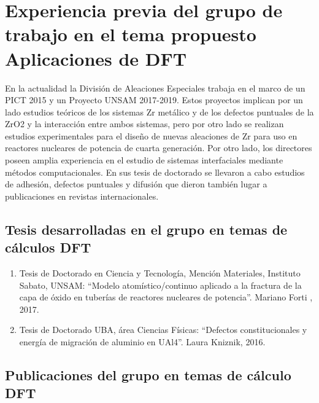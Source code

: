 \section*{Experiencia previa del grupo de trabajo en el tema propuesto Aplicaciones 
de DFT}

En la actualidad la División de Aleaciones Especiales trabaja en el marco de un 
PICT 2015 y un Proyecto UNSAM 2017-2019. Estos proyectos implican por un lado 
estudios teóricos de los sistemas Zr metálico y de los defectos puntuales de la 
ZrO2 y la interacción entre ambos sistemas, pero por otro lado se realizan 
estudios experimentales para el diseño de nuevas aleaciones de Zr para uso en 
reactores nucleares de potencia de cuarta generación. 
Por otro lado, los directores poseen amplia experiencia en el estudio de 
sistemas interfaciales mediante métodos computacionales. En sus tesis de 
doctorado se llevaron a cabo estudios de adhesión, defectos puntuales y 
difusión que dieron también lugar a publicaciones en revistas internacionales. 

\subsection{ Tesis desarrolladas en el grupo en temas de cálculos DFT}

\begin{enumerate}


\item Tesis de Doctorado en Ciencia y Tecnología, Mención Materiales, 
Instituto Sabato, UNSAM: “Modelo atomístico/continuo aplicado a la fractura de 
la capa de óxido en tuberías de reactores nucleares de potencia”. Mariano Forti 
, 2017.

\item Tesis de Doctorado UBA, área Ciencias Físicas: “Defectos 
constitucionales y energía de migración de aluminio en UAl4”. Laura Kniznik, 
2016. 

\end{enumerate}

\subsection{ Publicaciones del grupo en temas de cálculo DFT}

